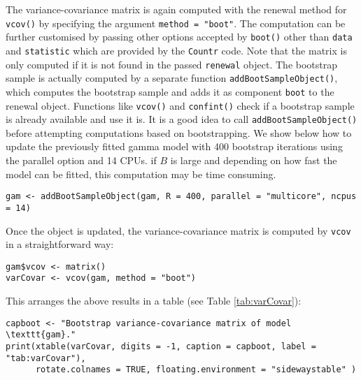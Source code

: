 \documentclass[a4paper,twoside,11pt]{article}
\begin{document}
The variance-covariance matrix is again computed with the renewal method for
\texttt{vcov()} by specifying the argument \texttt{method = "boot"}.  The computation can be
further customised by passing other options accepted by \texttt{boot()} other than
\texttt{data} and \texttt{statistic} which are provided by the \texttt{Countr} code.  Note that the
matrix is only computed if it is not found in the passed \texttt{renewal} object.  The
bootstrap sample is actually computed by a separate function
\texttt{addBootSampleObject()}, which computes the bootstrap sample and adds it as
component \texttt{boot} to the renewal object. Functions like \texttt{vcov()} and \texttt{confint()}
check if a bootstrap sample is already available and use it is.  It is a good
idea to call \texttt{addBootSampleObject()} before attempting computations based on
bootstrapping. We show below how to update the previously fitted gamma model
with 400 bootstrap iterations using the parallel option and 14 CPUs.  if \(B\) is
large and depending on how fast the model can be fitted, this computation may be
time consuming.
\begin{verbatim}
gam <- addBootSampleObject(gam, R = 400, parallel = "multicore", ncpus = 14)
\end{verbatim}

Once the object is updated, the variance-covariance matrix is computed by \texttt{vcov}
in a straightforward way:
\begin{verbatim}
gam$vcov <- matrix()
varCovar <- vcov(gam, method = "boot")
\end{verbatim}

This arranges the above results in a table (see Table \ref{tab:varCovar}):
\begin{verbatim}
capboot <- "Bootstrap variance-covariance matrix of model \texttt{gam}."
print(xtable(varCovar, digits = -1, caption = capboot, label = "tab:varCovar"), 
      rotate.colnames = TRUE, floating.environment = "sidewaystable" )
\end{verbatim}
\end{document}
